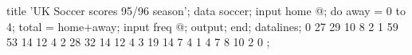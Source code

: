 \begin{listing}
title 'UK Soccer scores 95/96 season';
data soccer;
   input home @;
   do away = 0 to 4;
      total = home+away;
      input freq @;
      output;
      end;
datalines;
0   27 29 10  8  2
1   59 53 14 12  4
2   28 32 14 12  4
3   19 14  7  4  1
4    7  8 10  2  0
;
\end{listing}
